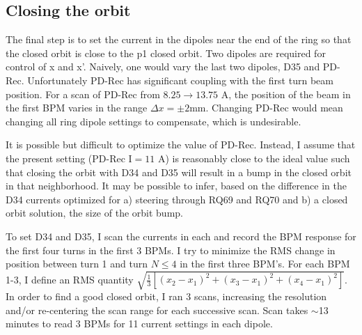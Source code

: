  
 
 
 
 
 
 
 
 
 
 
\subsection{Closing the orbit}

The final step is to set the current in the dipoles near the end of the ring so that the closed orbit is close to the p1 closed orbit.  Two dipoles are required for control of x and x'. Naively, one would vary the last two dipoles, D35 and PD-Rec. Unfortunately PD-Rec has significant coupling with the first turn beam position. For a scan of PD-Rec from $8.25 \rightarrow 13.75$ A, the position of the beam in the first BPM varies in the range $\Delta x = \pm 2$mm. Changing PD-Rec would mean changing all ring dipole settings to compensate, which is undesirable. 

It is possible but difficult to optimize the value of PD-Rec. Instead, I assume that the present setting (PD-Rec I$=11$ A) is reasonably close to the ideal value such that closing the orbit with D34 and D35 will result in a bump in the closed orbit in that neighborhood. It may be possible to infer, based on the difference in the D34 currents optimized for a) steering through RQ69 and RQ70 and b) a closed orbit solution, the size of the orbit bump. 

To set D34 and D35, I scan the currents in each and record the BPM response for the first four turns in the first 3 BPMs. I try to minimize the RMS change in position between turn 1 and turn $N\le4$ in the first three BPM's. For each BPM 1-3, I define an RMS quantity $\sqrt{\frac{1}{3}\left[ \left(x_2-x_1\right)^2+\left(x_3-x_1\right)^2+\left(x_4-x_1\right)^2\right]}$. In order to find a good closed orbit, I ran 3 scans, increasing the resolution and/or re-centering the scan range for each successive scan. Scan takes $\sim$13 minutes to read 3 BPMs for 11 current settings in each dipole. 

